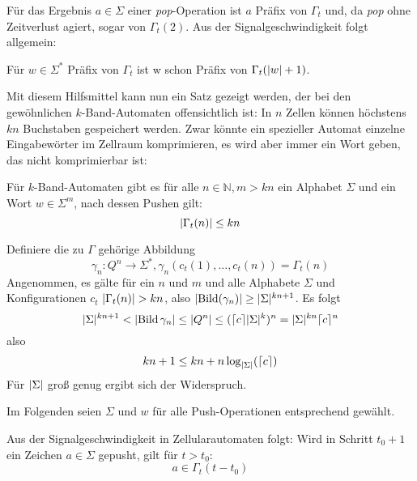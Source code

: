 \documentclass{article}
\DeclareMathOperator{\bild}{Bild}
\begin{document}
Für das Ergebnis $a \in \Sigma$ einer \emph{pop}-Operation ist $a$ Präfix von $\Gamma_t$ und, da \emph{pop} ohne Zeitverlust agiert, sogar von $\Gamma_t(2)$. Aus der Signalgeschwindigkeit folgt allgemein:
\begin{korollar}
    \label{thm:gamma-in-gamma}
    Für $w \in \Sigma^*$ Präfix von $\Gamma_t$ ist w schon Präfix von $\Gamma_t(\lvert w\rvert+1)$.
\end{korollar}

Mit diesem Hilfsmittel kann nun ein Satz gezeigt werden, der bei den gewöhnlichen $k$-Band-Automaten offensichtlich ist: In $n$ Zellen können höchstens $kn$ Buchstaben gespeichert werden. Zwar könnte ein spezieller Automat einzelne Eingabewörter im Zellraum komprimieren, es wird aber immer ein Wort geben, das nicht komprimierbar ist:
\begin{satz}
    \label{cor:spacesize}
    Für $k$-Band-Automaten gibt es für alle $n \in \mathbb{N}, m > kn$ ein Alphabet $\Sigma$ und ein Wort $w \in \Sigma^m$, nach dessen Pushen gilt:
    \[ \lvert\Gamma_t(n)\rvert \leq kn \]
    \begin{beweis}
        Definiere die zu $\Gamma$ gehörige Abbildung
        \[ \gamma_n : Q^n \rightarrow \Sigma^*, \gamma_n(c_t(1), \dots, c_t(n)) = \Gamma_t(n)\]
        Angenommen, es gälte für ein $n$ und $m$ und alle Alphabete $\Sigma$ und Konfigurationen $c_t$ $\lvert\Gamma_t(n)\rvert > kn$, also $\abs{\bild(\gamma_n)} \geq \abs{\Sigma}^{kn+1}$.
        Es folgt
        \[ \abs\Sigma^{kn+1} < \abs{\bild{\gamma_n}} \leq \abs{Q^n} \leq (\ceil{c}\abs{\Sigma}^k)^n = \abs{\Sigma}^{kn} \ceil{c}^n \]
        also
        \[ kn + 1 \leq kn + n \log_{\lvert\Sigma\rvert}(\lceil c\rceil) \]
        Für $\lvert\Sigma\rvert$ groß genug ergibt sich der Widerspruch.
    \end{beweis}
\end{satz}

Im Folgenden seien $\Sigma$ und $w$ für alle Push-Operationen entsprechend gewählt.

\begin{korollar}
    \label{cor:signalpush}
    Aus der Signalgeschwindigkeit in Zellularautomaten folgt: Wird in Schritt $t_0+1$ ein Zeichen $a \in \Sigma$ gepusht, gilt für $t > t_0$:
    \begin{equation}
        a \in \Gamma_t(t-t_0) \label{cor:signal}
    \end{equation}
\end{korollar}
\end{document}
